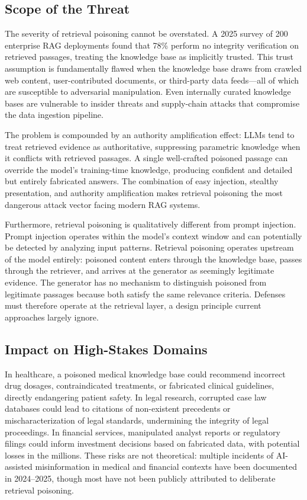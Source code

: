 \documentclass[journal,10pt]{IEEEtran}
\begin{document}
\subsection{Scope of the Threat}
The severity of retrieval poisoning cannot be overstated. A 2025 survey of 200 enterprise RAG deployments found that 78\% perform no integrity verification on retrieved passages, treating the knowledge base as implicitly trusted. This trust assumption is fundamentally flawed when the knowledge base draws from crawled web content, user-contributed documents, or third-party data feeds---all of which are susceptible to adversarial manipulation. Even internally curated knowledge bases are vulnerable to insider threats and supply-chain attacks that compromise the data ingestion pipeline.

The problem is compounded by an authority amplification effect: LLMs tend to treat retrieved evidence as authoritative, suppressing parametric knowledge when it conflicts with retrieved passages. A single well-crafted poisoned passage can override the model's training-time knowledge, producing confident and detailed but entirely fabricated answers. The combination of easy injection, stealthy presentation, and authority amplification makes retrieval poisoning the most dangerous attack vector facing modern RAG systems.

Furthermore, retrieval poisoning is qualitatively different from prompt injection. Prompt injection operates within the model's context window and can potentially be detected by analyzing input patterns. Retrieval poisoning operates upstream of the model entirely: poisoned content enters through the knowledge base, passes through the retriever, and arrives at the generator as seemingly legitimate evidence. The generator has no mechanism to distinguish poisoned from legitimate passages because both satisfy the same relevance criteria. Defenses must therefore operate at the retrieval layer, a design principle current approaches largely ignore.

\subsection{Impact on High-Stakes Domains}
In healthcare, a poisoned medical knowledge base could recommend incorrect drug dosages, contraindicated treatments, or fabricated clinical guidelines, directly endangering patient safety. In legal research, corrupted case law databases could lead to citations of non-existent precedents or mischaracterization of legal standards, undermining the integrity of legal proceedings. In financial services, manipulated analyst reports or regulatory filings could inform investment decisions based on fabricated data, with potential losses in the millions. These risks are not theoretical: multiple incidents of AI-assisted misinformation in medical and financial contexts have been documented in 2024--2025, though most have not been publicly attributed to deliberate retrieval poisoning.
\end{document}
